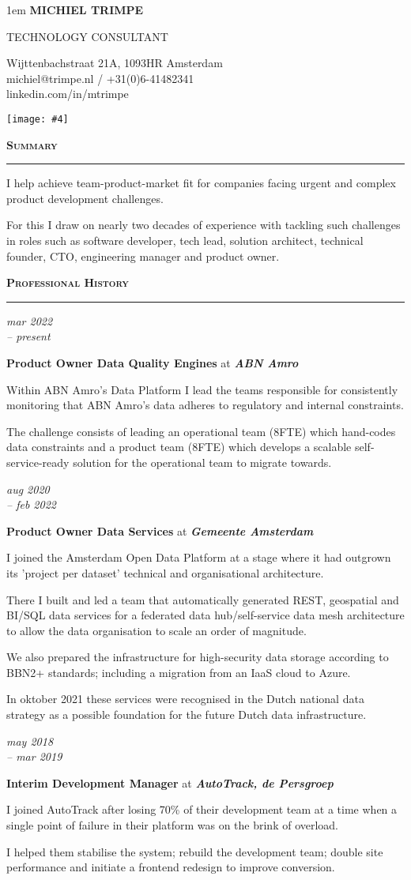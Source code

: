 \documentclass[a4paper,11pt]{article}
\newlength{\sectionindent}
\newlength{\detailsheigth}
\newlength{\datemarginwidth}
\newlength{\sectionheaderindent}
\newcommand{\personaldetails}[4]{
    \begin{minipage}[t][\detailsheigth]{\dimexpr\textwidth-\detailsheigth-2pt}
        \vspace{0pt}
        \begin{minipage}[t]{\textwidth}\openup 1em
            {\huge\textbf{\MakeUppercase{#1}}}
            \par
            {\LARGE\textsc{\MakeUppercase{#2}}}
        \end{minipage}
        \vfill
        \begin{minipage}[b]{\textwidth}
            #3
        \end{minipage}
    \end{minipage}
    \hfill
    \begin{minipage}[t]{\detailsheigth}
        \vspace{0pt}
        \raggedleft 
        \texttt{[image: \#4]}
    \end{minipage}}
\newcommand{\sectionheader}[1]{
    \vspace{1mm}
    \begin{minipage}[t]{\textwidth}
        \hspace{\sectionheaderindent}\textbf{\textsc{#1}}\\[-8pt\baselineskip] 
        \rule{\textwidth}{1pt}
    \end{minipage}\strut\vspace{3mm}}
\newcommand{\datemargin}[1]{
    \begin{minipage}[t]{\dimexpr\sectionindent-\datemarginwidth}
        \begin{flushright}
            \textit{#1}
        \end{flushright}
    \end{minipage}
    \hspace{\datemarginwidth}}
\newcommand{\emptymargin}[0]{
    \begin{minipage}[t]{\sectionindent}
    \strut
    \end{minipage}}
\newenvironment{summarysection}{
    \begingroup
    \setlength{\parskip}{4pt plus 2pt minus 1pt} 
}{
    \endgroup
}
\newcommand{\jobentry}[4]{
    \datemargin{#1}
    \begin{minipage}[t]{\dimexpr\textwidth-\sectionindent}
        \textbf{#2} at \textit{\textbf{#3}}\\[1pt]
        \begin{summarysection}
        #4
        \end{summarysection}
    \end{minipage}\vspace{4pt}}
\newcommand{\summaryentry}[1]{
    \emptymargin
    \begin{minipage}[t]{\dimexpr\textwidth-\sectionindent}
        \begin{summarysection}
            #1
        \end{summarysection}
    \end{minipage}}
\begin{document}
\personaldetails
    {Michiel Trimpe}
    {Technology Consultant}
    {
        Wijttenbachstraat 21A, 1093HR Amsterdam\\
        michiel@trimpe.nl / +31(0)6-41482341\\
        linkedin.com/in/mtrimpe
    }
    {./profile.jpg}

\sectionheader{Summary}
\summaryentry{
I help achieve team-product-market fit for companies facing urgent and complex product development challenges.

For this I draw on nearly two decades of experience with tackling such challenges in roles such as software developer, tech lead, solution architect, technical founder, CTO, engineering manager and product owner.}

\sectionheader{Professional History}
\jobentry{mar 2022\\-- present}{Product Owner Data Quality Engines}{ABN Amro}{
Within ABN Amro's Data Platform I lead the teams responsible for consistently monitoring that ABN Amro’s data adheres to regulatory and internal constraints. 

The challenge consists of leading an operational team (8FTE) which hand-codes data constraints and a product team (8FTE) which develops a scalable self-service-ready solution for the operational team to migrate towards.}

\jobentry{aug 2020\\-- feb 2022}{Product Owner Data Services}{Gemeente Amsterdam}{
I joined the Amsterdam Open Data Platform at a stage where it had outgrown its 'project per dataset' technical and organisational architecture.

There I built and led a team that automatically generated REST, geospatial and BI/SQL data services for a federated data hub/self-service data mesh architecture to allow the data organisation to scale an order of magnitude.

We also prepared the infrastructure for high-security data storage according to BBN2+ standards; including a migration from an IaaS cloud to Azure.

In oktober 2021 these services were recognised in the Dutch national data strategy as a possible foundation for the future Dutch data infrastructure.}

\jobentry{may 2018\\-- mar 2019}{Interim Development Manager}{AutoTrack, de Persgroep}{
I joined AutoTrack after losing 70\% of their development team at a time when a single point of failure in their platform was on the brink of overload.

I helped them stabilise the system; rebuild the development team; double site performance and initiate a frontend redesign to improve conversion.}
\end{document}
